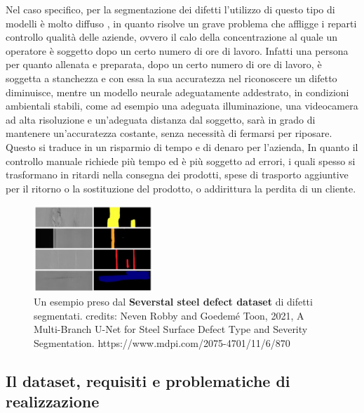 Nel caso specifico, per la segmentazione dei difetti l'utilizzo di questo tipo di modelli è molto diffuso \cite{ieee2020dlqualitycontrol, zhu2021deep}, in quanto risolve un grave problema 
che affligge i reparti controllo qualità delle aziende, ovvero il calo della concentrazione al quale un operatore è soggetto dopo un certo numero di ore di lavoro.
Infatti una persona per quanto allenata e preparata, dopo un certo numero di ore di lavoro, è soggetta a stanchezza e con essa
la sua accuratezza nel riconoscere un difetto diminuisce, mentre un modello neurale adeguatamente addestrato, in condizioni ambientali stabili,
come ad esempio una adeguata illuminazione, una videocamera ad alta risoluzione e un'adeguata distanza dal soggetto, sarà in grado di mantenere 
un'accuratezza costante, senza necessità di fermarsi per riposare. Questo si traduce in un risparmio di tempo e di denaro per l'azienda,
In quanto il controllo manuale richiede più tempo ed è più soggetto ad errori, i quali spesso si trasformano in ritardi nella consegna dei prodotti,
spese di trasporto aggiuntive per il ritorno o la sostituzione del prodotto, o addirittura la perdita di un cliente.

\begin{figure}[H]
    \centering
    \includegraphics[width=0.4\textwidth]{imgs/segm_example_1_crop.png}
    \caption{Un esempio preso dal \textbf{Severstal steel defect dataset} di difetti segmentati.
    credits: Neven Robby and Goedemé Toon, 2021, A Multi-Branch U-Net for Steel Surface Defect Type and Severity Segmentation.
    https://www.mdpi.com/2075-4701/11/6/870}
    \label{fig:segm_example_1}
\end{figure}


\subsection{Il dataset, requisiti e problematiche di realizzazione \ok}

